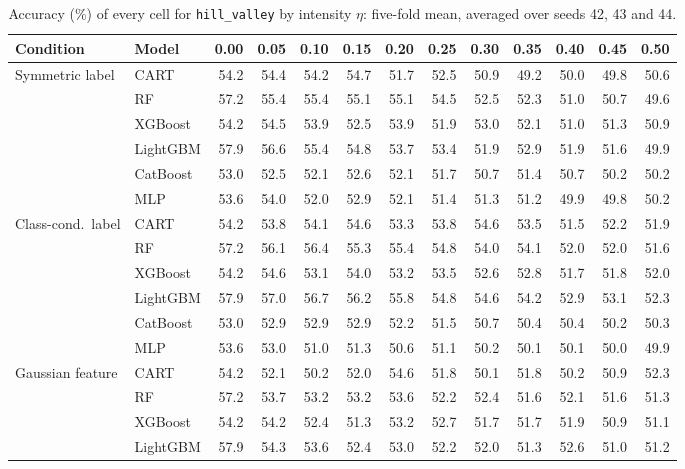 \begin{table}[p]
\centering
\tiny
\setlength{\tabcolsep}{2.6pt}
\caption{Accuracy (\%) of every cell for \texttt{hill\_valley} by intensity $\eta$: five-fold mean, averaged over seeds 42, 43 and 44.}
\label{tab:grid_hill_valley}
\begin{tabular}{@{}llrrrrrrrrrrr@{}}
\toprule
Condition & Model & 0.00 & 0.05 & 0.10 & 0.15 & 0.20 & 0.25 & 0.30 & 0.35 & 0.40 & 0.45 & 0.50 \\
\midrule
Symmetric label & CART & 54.2 & 54.4 & 54.2 & 54.7 & 51.7 & 52.5 & 50.9 & 49.2 & 50.0 & 49.8 & 50.6 \\
 & RF & 57.2 & 55.4 & 55.4 & 55.1 & 55.1 & 54.5 & 52.5 & 52.3 & 51.0 & 50.7 & 49.6 \\
 & XGBoost & 54.2 & 54.5 & 53.9 & 52.5 & 53.9 & 51.9 & 53.0 & 52.1 & 51.0 & 51.3 & 50.9 \\
 & LightGBM & 57.9 & 56.6 & 55.4 & 54.8 & 53.7 & 53.4 & 51.9 & 52.9 & 51.9 & 51.6 & 49.9 \\
 & CatBoost & 53.0 & 52.5 & 52.1 & 52.6 & 52.1 & 51.7 & 50.7 & 51.4 & 50.7 & 50.2 & 50.2 \\
 & MLP & 53.6 & 54.0 & 52.0 & 52.9 & 52.1 & 51.4 & 51.3 & 51.2 & 49.9 & 49.8 & 50.2 \\
\midrule
Class-cond.\ label & CART & 54.2 & 53.8 & 54.1 & 54.6 & 53.3 & 53.8 & 54.6 & 53.5 & 51.5 & 52.2 & 51.9 \\
 & RF & 57.2 & 56.1 & 56.4 & 55.3 & 55.4 & 54.8 & 54.0 & 54.1 & 52.0 & 52.0 & 51.6 \\
 & XGBoost & 54.2 & 54.6 & 53.1 & 54.0 & 53.2 & 53.5 & 52.6 & 52.8 & 51.7 & 51.8 & 52.0 \\
 & LightGBM & 57.9 & 57.0 & 56.7 & 56.2 & 55.8 & 54.8 & 54.6 & 54.2 & 52.9 & 53.1 & 52.3 \\
 & CatBoost & 53.0 & 52.9 & 52.9 & 52.9 & 52.2 & 51.5 & 50.7 & 50.4 & 50.4 & 50.2 & 50.3 \\
 & MLP & 53.6 & 53.0 & 51.0 & 51.3 & 50.6 & 51.1 & 50.2 & 50.1 & 50.1 & 50.0 & 49.9 \\
\midrule
Gaussian feature & CART & 54.2 & 52.1 & 50.2 & 52.0 & 54.6 & 51.8 & 50.1 & 51.8 & 50.2 & 50.9 & 52.3 \\
 & RF & 57.2 & 53.7 & 53.2 & 53.2 & 53.6 & 52.2 & 52.4 & 51.6 & 52.1 & 51.6 & 51.3 \\
 & XGBoost & 54.2 & 54.2 & 52.4 & 51.3 & 53.2 & 52.7 & 51.7 & 51.7 & 51.9 & 50.9 & 51.1 \\
 & LightGBM & 57.9 & 54.3 & 53.6 & 52.4 & 53.0 & 52.2 & 52.0 & 51.3 & 52.6 & 51.0 & 51.2 \\

\end{tabular}
\end{table}

